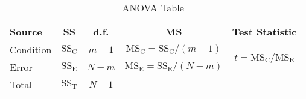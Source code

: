 \begin{table}[!htbp]
      \centering
      \caption{ANOVA Table}
      \begin{NiceTabular}{|l|c|c|c|c|}
            \toprule
            Source    & SS                     & d.f.    & MS                                                               & Test Statistic                                                   \\
            \midrule
            Condition & $ \text{SS}_\text{C} $ & $ m-1 $ & $ \text{MS}_\text{C}=\text{SS}_\text{C}/(m-1) $ &  \\
            Error     & $ \text{SS}_\text{E} $ & $ N-m $ & $ \text{MS}_\text{E}=\text{SS}_\text{E}/(N-m) $                                                               \\
            \midrule
            Total     & $ \text{SS}_\text{T} $ & $ N-1 $\\
            \bottomrule
      \end{NiceTabular}
\end{table}
